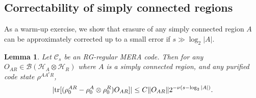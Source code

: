 \documentclass[a4paper,11pt]{article}
\newcommand{\1}{\mathbbm{1}}
\newcommand{\cC}{\mathcal{C}}
\newcommand{\tr}{{\rm tr}}
\newtheorem{lem}{Lemma}
\begin{document}
\subsection{Correctability of simply connected regions}
As a warm-up exercise, we show that erasure of any simply connected region $A$ can be approximately corrected up to a small error if $s\gg\log_2|A|$.
\begin{lem}
	\label{lem:simply_connected}
	Let $\cC_s$ be an RG-regular MERA code. Then for any $O_{AR} \in \mathcal{B}(\mathcal{H}_A \otimes \mathcal{H}_R)$ where $A$ is a simply connected region, and any purified code state
	$\rho^{AA^cR}$,
	\begin{equation}
		|\tr[(\rho_0^{AR} - \rho_0^A \otimes \rho_0^R)O_{AR}]| \leq C \| O_{AR} \| 2^{-\nu(s-\log_2|A|)}.\label{eq:correctability_bound}
	\end{equation}
\end{lem}
\end{document}
